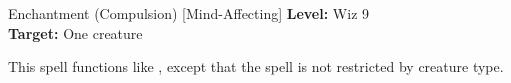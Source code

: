 {Enchantment (Compulsion) [Mind-Affecting]}
{
	\textbf{Level:}
	Wiz 9\\
	\textbf{Target:}
	One creature\\
}
{
	This spell functions like , except that the spell is not restricted by creature type.

}

